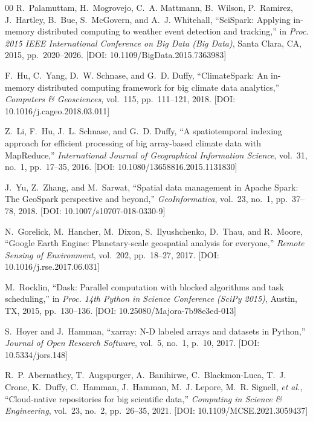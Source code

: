 \documentclass[10pt,conference]{IEEEtran}
\begin{document}
\begin{thebibliography}{00}
R.~Palamuttam, H.~Mogrovejo, C.~A. Mattmann, B.~Wilson, P.~Ramirez, J.~Hartley, B.~Bue, S.~McGovern, and A.~J. Whitehall, ``SciSpark: Applying in-memory distributed computing to weather event detection and tracking,'' in \textit{Proc. 2015 IEEE International Conference on Big Data (Big Data)}, Santa Clara, CA, 2015, pp.~2020--2026. [DOI: 10.1109/BigData.2015.7363983]

F.~Hu, C.~Yang, D.~W. Schnase, and G.~D. Duffy, ``ClimateSpark: An in-memory distributed computing framework for big climate data analytics,'' \textit{Computers \& Geosciences}, vol.~115, pp.~111--121, 2018. [DOI: 10.1016/j.cageo.2018.03.011]

Z.~Li, F.~Hu, J.~L. Schnase, and G.~D. Duffy, ``A spatiotemporal indexing approach for efficient processing of big array-based climate data with MapReduce,'' \textit{International Journal of Geographical Information Science}, vol.~31, no.~1, pp.~17--35, 2016. [DOI: 10.1080/13658816.2015.1131830]

J.~Yu, Z.~Zhang, and M.~Sarwat, ``Spatial data management in Apache Spark: The GeoSpark perspective and beyond,'' \textit{GeoInformatica}, vol.~23, no.~1, pp.~37--78, 2018. [DOI: 10.1007/s10707-018-0330-9]

N.~Gorelick, M.~Hancher, M.~Dixon, S.~Ilyushchenko, D.~Thau, and R.~Moore, ``Google Earth Engine: Planetary-scale geospatial analysis for everyone,'' \textit{Remote Sensing of Environment}, vol.~202, pp.~18--27, 2017. [DOI: 10.1016/j.rse.2017.06.031]

M.~Rocklin, ``Dask: Parallel computation with blocked algorithms and task scheduling,'' in \textit{Proc. 14th Python in Science Conference (SciPy 2015)}, Austin, TX, 2015, pp.~130--136. [DOI: 10.25080/Majora-7b98e3ed-013]

S.~Hoyer and J.~Hamman, ``xarray: N-D labeled arrays and datasets in Python,'' \textit{Journal of Open Research Software}, vol.~5, no.~1, p.~10, 2017. [DOI: 10.5334/jors.148]

R.~P. Abernathey, T.~Augspurger, A.~Banihirwe, C.~Blackmon-Luca, T.~J. Crone, K.~Duffy, C.~Hamman, J.~Hamman, M.~J. Lepore, M.~R. Signell, \textit{et al.}, ``Cloud-native repositories for big scientific data,'' \textit{Computing in Science \& Engineering}, vol.~23, no.~2, pp.~26--35, 2021. [DOI: 10.1109/MCSE.2021.3059437]


\end{thebibliography}
\end{document}
